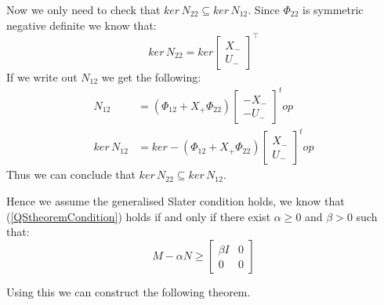 Now we only need to check that $ker \, N_{22} \subseteq ker \, N_{12}$. Since $\Phi_{22}$ is symmetric negative definite we know that:
\[ ker \, N_{22} = ker \begin{bmatrix} X_- \\ U_- \end{bmatrix}^\top \]
If we write out $N_{12}$ we get the following:
\begin{align*}
	 N_{12} &= (\Phi_{12} + X_+ \Phi_{22}) \begin{bmatrix} -X_- \\ -U_- \end{bmatrix}^top \\
	 ker \, N_{12} &= ker -(\Phi_{12} + X_+ \Phi_{22}) \begin{bmatrix} X_- \\ U_- \end{bmatrix}^top
\end{align*}
Thus we can conclude that $ker \, N_{22} \subseteq ker \, N_{12}$. 

Hence we assume the generalised Slater condition holds, we know that (\ref{QStheoremCondition}) holds if and only if there exist $\alpha \geq 0$ and $\beta > 0$ such that:
\begin{equation*}
	M - \alpha N \geq \begin{bmatrix} \beta I & 0 \\ 0 & 0 \end{bmatrix}
\end{equation*}

Using this we can construct the following theorem.


